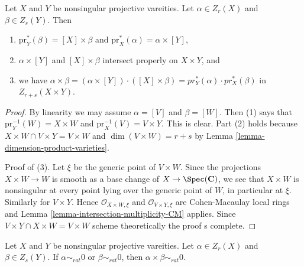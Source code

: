 \begin{lemma}
\label{lemma-exterior-product}
Let $X$ and $Y$ be nonsingular projective vareities.
Let $\alpha \in Z_r(X)$ and $\beta \in Z_s(Y)$.
Then
\begin{enumerate}
\item $\text{pr}_Y^*(\beta) = [X] \times \beta$ and
$\text{pr}_X^*(\alpha) = \alpha \times [Y]$,
\item $\alpha \times [Y]$ and $[X]\times \beta$
intersect properly on $X\times Y$, and
\item we have
$\alpha \times \beta =
(\alpha \times [Y])\cdot ([X]\times\beta) =
pr_Y^*(\alpha) \cdot pr_X^*(\beta)$
in $Z_{r + s}(X \times Y)$.
\end{enumerate}
\end{lemma}

\begin{proof}
By linearity we may assume $\alpha = [V]$ and $\beta = [W]$.
Then (1) says that $\text{pr}_Y^{-1}(W) = X \times W$ and
$\text{pr}_X^{-1}(V) = V \times Y$. This is clear.
Part (2) holds because $X \times W \cap V \times Y = V \times W$ and
$\dim(V \times W) = r + s$ by Lemma \ref{lemma-dimension-product-varieties}.

\medskip\noindent
Proof of (3).
Let $\xi$ be the generic point of $V \times W$.
Since the projections $X \times W \to W$ is smooth as a base change of
$X \to \Spec(\mathbf{C})$, we see that $X \times W$ is nonsingular
at every point lying over the generic point of $W$, in particular at $\xi$.
Similarly for $V \times Y$. Hence $\mathcal{O}_{X \times W, \xi}$
and $\mathcal{O}_{V \times Y, \xi}$ are Cohen-Macaulay local rings
and Lemma \ref{lemma-intersection-multiplicity-CM} applies.
Since $V \times Y \cap X \times W = V \times W$ scheme theoretically
the proof s complete.
\end{proof}

\begin{lemma}
\label{lemma-exterior-product-rational-equivalence}
Let $X$ and $Y$ be nonsingular projective vareities.
Let $\alpha \in Z_r(X)$ and $\beta \in Z_s(Y)$.
If $\alpha \sim_{rat} 0$ or $\beta \sim_{rat} 0$, then
$\alpha \times \beta \sim_{rat} 0$.
\end{lemma}


